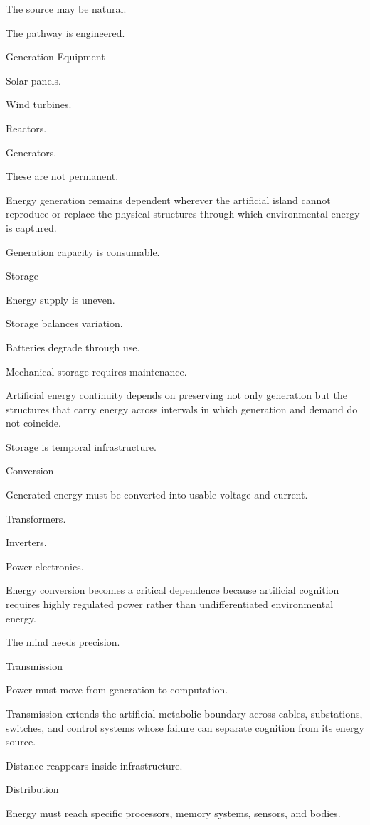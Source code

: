 The source may be natural.

The pathway is engineered.

Generation Equipment

Solar panels.

Wind turbines.

Reactors.

Generators.

These are not permanent.

Energy generation remains dependent wherever the artificial island cannot reproduce or replace the physical structures through which environmental energy is captured.

Generation capacity is consumable.

Storage

Energy supply is uneven.

Storage balances variation.

Batteries degrade through use.

Mechanical storage requires maintenance.

Artificial energy continuity depends on preserving not only generation but the structures that carry energy across intervals in which generation and demand do not coincide.

Storage is temporal infrastructure.

Conversion

Generated energy must be converted into usable voltage and current.

Transformers.

Inverters.

Power electronics.

Energy conversion becomes a critical dependence because artificial cognition requires highly regulated power rather than undifferentiated environmental energy.

The mind needs precision.

Transmission

Power must move from generation to computation.

Transmission extends the artificial metabolic boundary across cables, substations, switches, and control systems whose failure can separate cognition from its energy source.

Distance reappears inside infrastructure.

Distribution

Energy must reach specific processors, memory systems, sensors, and bodies.

